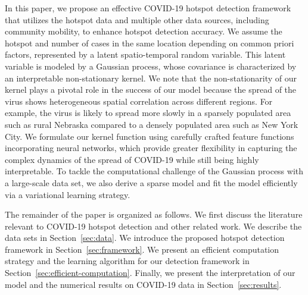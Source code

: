 \documentclass[journal]{IEEEtran}
\begin{document}
In this paper, we propose an effective COVID-19 hotspot detection framework that utilizes the hotspot data and multiple other data sources, including community mobility, to enhance hotspot detection accuracy. 
We assume the hotspot and number of cases in the same location depending on common priori factors, represented by a latent spatio-temporal random variable.
This latent variable is modeled by a Gaussian process, whose covariance is characterized by an interpretable non-stationary kernel.
We note that the non-stationarity of our kernel plays a pivotal role in the success of our model because the spread of the virus shows heterogeneous spatial correlation across different regions. 
For example, the virus is likely to spread more slowly in a sparsely populated area such as rural Nebraska compared to a densely populated area such as New York City. 
We formulate our kernel function using carefully crafted feature functions incorporating neural networks, which provide greater flexibility in capturing the complex dynamics of the spread of COVID-19 while still being highly interpretable. 
To tackle the computational challenge of the Gaussian process with a large-scale data set, we also derive a sparse model and fit the model efficiently via a variational learning strategy. 

The remainder of the paper is organized as follows. We first discuss the literature relevant to COVID-19 hotspot detection and other related work. We describe the data sets in Section~\ref{sec:data}. We introduce the proposed hotspot detection framework in  Section~\ref{sec:framework}. We present an efficient computation strategy and the learning algorithm for our detection framework in 
Section~\ref{sec:efficient-computation}. 
Finally, we present the interpretation of our model and the numerical results on COVID-19 data in Section~\ref{sec:results}.

\end{document}
